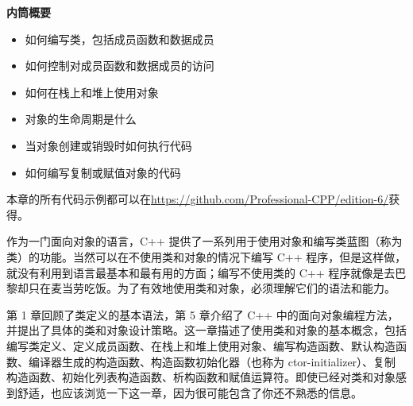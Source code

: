 \noindent
\textbf{内筒概要}

\begin{itemize}
\item
如何编写类，包括成员函数和数据成员

\item
如何控制对成员函数和数据成员的访问

\item
如何在栈上和堆上使用对象

\item
对象的生命周期是什么

\item
当对象创建或销毁时如何执行代码

\item
如何编写复制或赋值对象的代码
\end{itemize}

本章的所有代码示例都可以在\url{https://github.com/Professional-CPP/edition-6/}获得。

作为一门面向对象的语言，C++ 提供了一系列用于使用对象和编写类蓝图（称为类）的功能。当然可以在不使用类和对象的情况下编写 C++ 程序，但是这样做，就没有利用到语言最基本和最有用的方面；编写不使用类的 C++ 程序就像是去巴黎却只在麦当劳吃饭。为了有效地使用类和对象，必须理解它们的语法和能力。

第 1 章回顾了类定义的基本语法，第 5 章介绍了 C++ 中的面向对象编程方法，并提出了具体的类和对象设计策略。这一章描述了使用类和对象的基本概念，包括编写类定义、定义成员函数、在栈上和堆上使用对象、编写构造函数、默认构造函数、编译器生成的构造函数、构造函数初始化器（也称为 ctor-initializer）、复制构造函数、初始化列表构造函数、析构函数和赋值运算符。即使已经对类和对象感到舒适，也应该浏览一下这一章，因为很可能包含了你还不熟悉的信息。
























